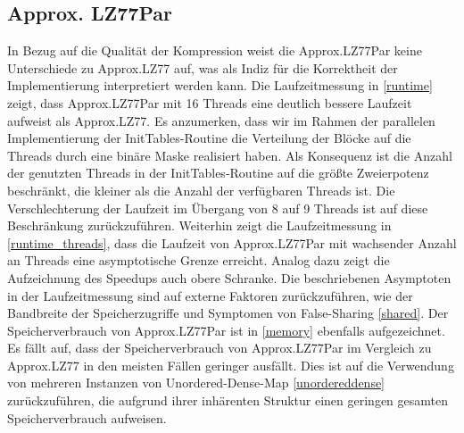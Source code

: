 \subsection{Approx. LZ77Par}
In Bezug auf die Qualität der Kompression weist die Approx.LZ77Par keine Unterschiede zu Approx.LZ77 auf, was als Indiz für die Korrektheit der Implementierung
interpretiert werden kann. Die Laufzeitmessung in \ref{runtime} zeigt, dass Approx.LZ77Par mit 16 Threads eine deutlich bessere Laufzeit aufweist als Approx.LZ77.
Es anzumerken, dass wir im Rahmen der parallelen Implementierung der InitTables-Routine die Verteilung der Blöcke auf die Threads durch eine binäre Maske realisiert haben.
Als Konsequenz ist die Anzahl der genutzten Threads in der InitTables-Routine auf die größte Zweierpotenz beschränkt, die kleiner als die Anzahl der verfügbaren Threads ist.
Die Verschlechterung der Laufzeit im Übergang von 8 auf 9 Threads ist auf diese Beschränkung zurückzuführen. Weiterhin zeigt die Laufzeitmessung in \ref{runtime_threads},
dass die Laufzeit von Approx.LZ77Par mit wachsender Anzahl an Threads eine asymptotische Grenze erreicht. Analog dazu zeigt die Aufzeichnung des Speedups auch
obere Schranke. Die beschriebenen Asymptoten in der Laufzeitmessung sind auf externe Faktoren zurückzuführen, wie der Bandbreite der Speicherzugriffe und Symptomen von 
False-Sharing \ref{shared}.
Der Speicherverbrauch von Approx.LZ77Par ist in \ref{memory} ebenfalls aufgezeichnet. Es fällt auf, dass der Speicherverbrauch von Approx.LZ77Par im Vergleich zu Approx.LZ77 
in den meisten Fällen geringer ausfällt. Dies ist auf die Verwendung von mehreren Instanzen von Unordered-Dense-Map \ref{unordereddense} zurückzuführen, die aufgrund ihrer 
inhärenten Struktur einen geringen gesamten Speicherverbrauch aufweisen.
